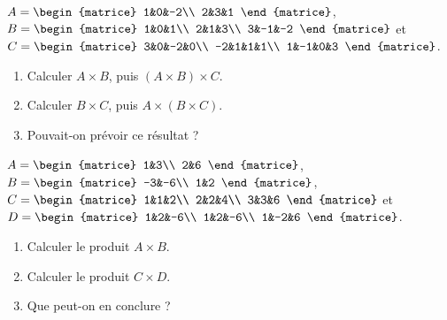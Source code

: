 \begin{exercice}[]
	$A=\begin{matrice}
			1&0&-2\\
			2&3&1
		\end{matrice}$,
	$B=\begin{matrice}
			1&0&1\\
			2&1&3\\
			3&-1&-2
		\end{matrice}$ et
	$C=\begin{matrice}
			3&0&-2&0\\
			-2&1&1&1\\
			1&-1&0&3
		\end{matrice}$.\\
	
	\begin{enumerate}
		\item 	Calculer $A\times B$, puis $(A\times B)\times C$.
		\item 	Calculer $B\times C$, puis $A\times(B\times C)$.
		\item   Pouvait-on prévoir ce résultat ?\\
	\end{enumerate}
\end{exercice}

\begin{exercice}
	$A=\begin{matrice}
			1&3\\
			2&6
		\end{matrice}$,
	$B=\begin{matrice}
			-3&-6\\
			1&2
		\end{matrice}$,
	$C=\begin{matrice}
			1&1&2\\
			2&2&4\\
			3&3&6
		\end{matrice}$ et
	$D=\begin{matrice}
			1&2&-6\\
			1&2&-6\\
			1&-2&6
		\end{matrice}$.
	
	\begin{enumerate}
		\item 	Calculer le produit $A\times B$.
		\item 	Calculer le produit $C\times D$.
		\item  Que peut-on en conclure ?
	\end{enumerate}
	
\end{exercice}


